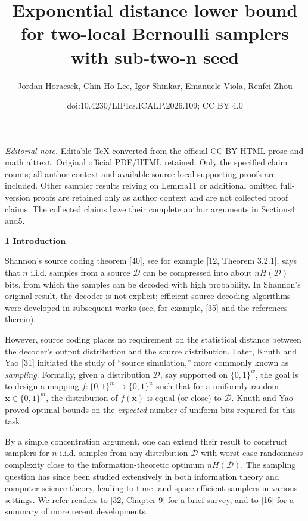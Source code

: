 \documentclass[10pt,a4paper]{article}
\title{Exponential distance lower bound for two-local Bernoulli samplers with sub-two-n seed}
\author{Jordan Horacsek, Chin Ho Lee, Igor Shinkar, Emanuele Viola, Renfei Zhou}
\date{doi:10.4230/LIPIcs.ICALP.2026.109; CC BY 4.0}
\begin{document}
\maketitle
\noindent\textit{Editorial note.} Editable TeX converted from the official CC BY HTML prose and math alttext. Original official PDF/HTML retained. Only the specified claim counts; all author context and available source-local supporting proofs are included. Other sampler results relying on Lemma11 or additional omitted full-version proofs are retained only as author context and are not collected proof claims. The collected claims have their complete author arguments in Sections4 and5.\par\medskip


\par\medskip\noindent\textbf{
1 Introduction}\par




Shannon’s source coding theorem [40], see for example [12, Theorem 3.2.1], says that $n$ i.i.d. samples from a source $\mathcal{D}$ can be compressed into about $nH(\mathcal{D})$ bits, from which the samples can be decoded with high probability. In Shannon’s original result, the decoder is not explicit; efficient source decoding algorithms were developed in subsequent works (see, for example, [35] and the references therein).\par




However, source coding places no requirement on the statistical distance between the decoder’s output distribution and the source distribution.
Later, Knuth and Yao [31] initiated the study of “source simulation,” more commonly known as \emph{sampling}.
Formally, given a distribution $\mathcal{D}$, say supported on $\{0,1\}^{w}$, the goal is to design a mapping $f\colon\{0,1\}^{m}\to\{0,1\}^{w}$ such that for a uniformly random $\boldsymbol{x}\in\{0,1\}^{m}$, the distribution of $f(\boldsymbol{x})$ is equal (or close) to $\mathcal{D}$.
Knuth and Yao proved optimal bounds on the \emph{expected} number of uniform bits required for this task.\par




By a simple concentration argument, one can extend their result to construct samplers for $n$ i.i.d. samples from any distribution $\mathcal{D}$ with worst-case randomness complexity close to the information-theoretic optimum $nH(\mathcal{D})$.
The sampling question has since been studied extensively in both information theory and computer science theory, leading to time- and space-efficient samplers in various settings.
We refer readers to [32, Chapter 9] for a brief survey, and to [16] for a summary of more recent developments.\par
\end{document}
